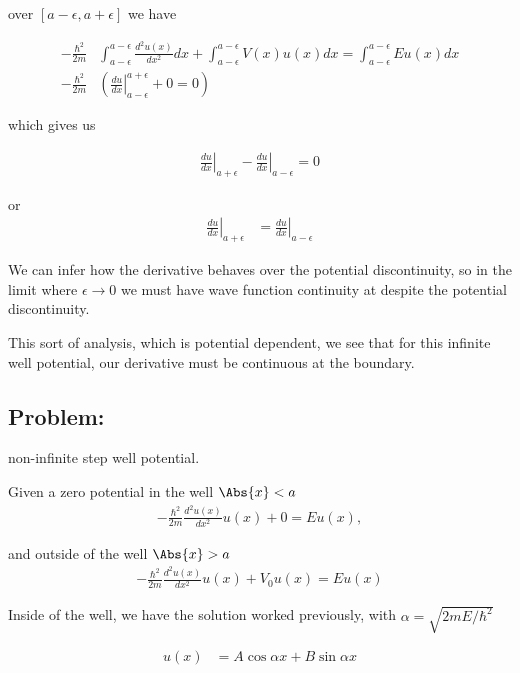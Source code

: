 over $[a-\epsilon,a+\epsilon]$ we have

\begin{align}\label{eqn:PHY356Lecture9:21}
-\frac{\hbar^2 }{2m} &
\int_{a-\epsilon}^{a-\epsilon}
\frac{d^2 u(x)}{dx^2} dx
+
\int_{a-\epsilon}^{a-\epsilon}
V(x) u(x) dx =
\int_{a-\epsilon}^{a-\epsilon}
E u(x) dx \\
-\frac{\hbar^2 }{2m} &
\left(
\left.\frac{du}{dx}\right\vert_{a-\epsilon}^{a+\epsilon} + 0 = 0
\right)
\end{align}

which gives us

\begin{align}\label{eqn:PHY356Lecture9:22}
\left.\frac{du}{dx}\right\vert_{a + \epsilon}
-\left.\frac{du}{dx}\right\vert_{a - \epsilon} = 0
\end{align}

or
\begin{align}\label{eqn:PHY356Lecture9:23}
\left.\frac{du}{dx}\right\vert_{a + \epsilon}
&=
\left.\frac{du}{dx}\right\vert_{a - \epsilon}
\end{align}

We can infer how the derivative behaves over the potential discontinuity, so in the limit where $\epsilon \rightarrow 0$ we must have wave function continuity at despite the potential discontinuity.

This sort of analysis, which is potential dependent, we see that for this infinite well potential, our derivative must be continuous at the boundary.

\subsection{Problem:}  non-infinite step well potential.

Given a zero potential in the well $\Abs{x} < a$
\begin{align}\label{eqn:PHY356Lecture9:30}
-\frac{\hbar^2 }{2m} \frac{d^2 u(x)}{dx^2} u(x) + 0 = E u(x),
\end{align}

and outside of the well $\Abs{x} > a$
\begin{align}\label{eqn:PHY356Lecture9:31}
-\frac{\hbar^2 }{2m} \frac{d^2 u(x)}{dx^2} u(x) + V_0 u(x) = E u(x)
\end{align}

Inside of the well, we have the solution worked previously, with $\alpha = \sqrt{2m E/\hbar^2}$

\begin{align}\label{eqn:PHY356Lecture9:32}
u(x) &= A \cos\alpha x + B \sin\alpha x
\end{align}

